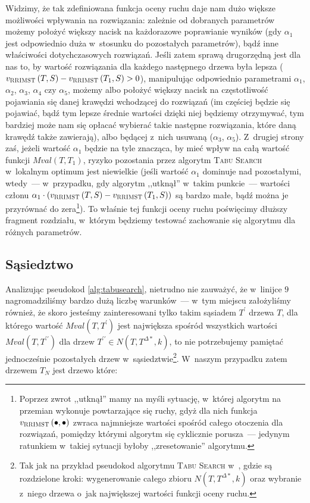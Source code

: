 Widzimy, że tak zdefiniowana funkcja oceny ruchu daje nam dużo większe możliwości wpływania na rozwiązania: zależnie od dobranych parametrów możemy położyć większy nacisk na każdorazowe poprawianie wyników (gdy $\alpha_{1}$ jest odpowiednio duża w~stosunku do pozostałych parametrów), bądź inne właściwości dotychczasowych rozwiązań.
Jeśli zatem sprawą drugorzędną jest dla nas to, by wartość rozwiązania dla każdego następnego drzewa była lepsza ($v_{\textsc{RRIMST}} \left( T, S \right) - v_{\textsc{RRIMST}} \left( T_{1}, S \right) > 0$), manipulując odpowiednio parametrami $\alpha_{1}$, $\alpha_{2}$, $\alpha_{3}$, $\alpha_{4}$ czy $\alpha_{5}$, możemy albo położyć większy nacisk na częstotliwość pojawiania się danej krawędzi wchodzącej do rozwiązań (im częściej będzie się pojawiać, bądź tym lepsze średnie wartości dzięki niej będziemy otrzymywać, tym bardziej może nam się opłacać wybierać takie następne rozwiązania, które daną krawędź także zawierają), albo będącej z~nich usuwaną ($\alpha_{3}$, $\alpha_{5}$).
Z~drugiej strony zaś, jeżeli wartość $\alpha_{1}$ będzie na tyle znacząca, by mieć wpływ na całą wartość funkcji $Mval \left( T, T_{1} \right)$, ryzyko pozostania przez algorytm \textsc{Tabu Search} w~lokalnym optimum jest niewielkie (jeśli wartość $\alpha_{1}$ dominuje nad pozostałymi, wtedy~--- w~przypadku, gdy algorytm ,,utknął'' w~takim punkcie~--- wartości członu $\alpha_{1} \cdot \left( v_{\textsc{RRIMST}} \left( T, S \right) - v_{\textsc{RRIMST}} \left( T_{1}, S \right) \right)$ są bardzo małe, bądź można je przyrównać do zera\footnote{
	Poprzez zwrot ,,utknął'' mamy na myśli sytuację, w~której algorytm na przemian wykonuje powtarzające się ruchy, gdyż dla nich funkcja $v_{\textsc{RRIMST}} \left( \bullet, \bullet \right)$ zwraca najmniejsze wartości spośród całego otoczenia dla rozwiązań, pomiędzy którymi algorytm się cyklicznie porusza~--- jedynym ratunkiem w~takiej sytuacji byłoby ,,zresetowanie'' algorytmu.
}).
To właśnie tej funkcji oceny ruchu poświęcimy dłuższy fragment rozdziału, w~którym będziemy testować zachowanie się algorytmu dla różnych parametrów.



\subsection{Sąsiedztwo}



Analizując pseudokod \ref{alg:tabusearch}, nietrudno nie zauważyć, że w~linijce $9$ nagromadziliśmy bardzo dużą liczbę warunków~--- w~tym miejscu założyliśmy również, że skoro jesteśmy zainteresowani tylko takim sąsiadem $T^{\prime}$ drzewa $T$, dla którego wartość $Mval \left( T, T^{\prime} \right)$ jest największa spośród wszystkich wartości $Mval \left( T, T^{\prime\prime} \right)$ dla drzew $T^{\prime\prime} \in N \left( T, T^{\Delta\ast}, k \right)$, to nie potrzebujemy pamiętać jednocześnie pozostałych drzew w~sąsiedztwie\footnote{
	Tak jak na przykład pseudokod algorytmu \textsc{Tabu Search} w~\cite{Kasperski2012}, gdzie są rozdzielone kroki: wygenerowanie całego zbioru $N \left( T, T^{\Delta\ast}, k \right)$ oraz wybranie z~niego drzewa o~jak największej wartości funkcji oceny ruchu.
}.
W~naszym przypadku zatem drzewem $T_{N}$ jest drzewo które:

